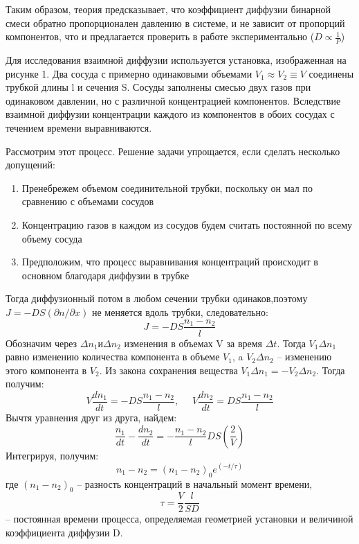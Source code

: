 \documentclass[a4paper,12pt]{article}
\begin{document}
Таким образом, теория предсказывает, что коэффициент диффузии бинарной смеси обратно пропорционален давлению в системе, и не зависит от пропорций компонентов, что и предлагается проверить в работе экспериментально ($D\propto\frac{1}{P}$)

Для исследования взаимной диффузии используется установка, изображенная на рисунке 1. Два сосуда с примерно одинаковыми объемами $V_1 \approx V_2 \equiv V$ соединены трубкой длины l и сечения S. Сосуды заполнены смесью двух газов при одинаковом давлении, но с различной концентрацией компонентов. Вследствие взаимной диффузии концентрации каждого из компонентов в обоих сосудах с течением времени выравниваются. 

Рассмотрим этот процесс. Решение задачи упрощается, если сделать несколько допущений:
\begin{enumerate}
\itemsep0em
\item Пренебрежем объемом соединительной трубки, поскольку он мал по сравнению с объемами сосудов
\item Концентрацию газов в каждом из сосудов будем считать постоянной по всему объему сосуда
\item Предположим, что процесс выравнивания концентраций происходит в основном благодаря диффузии в трубке
\end{enumerate}
Тогда диффузионный потом в любом сечении трубки одинаков,поэтому $J = -DS(\partial n/ \partial x)$ не меняется вдоль трубки, следовательно:
\begin{equation}
J = -DS\frac{n_1 - n_2}{l}
\end{equation}
Обозначим через $\Delta n_1 \text{и} \Delta n_2$ изменения в объемах V за время $\Delta t$. Тогда $V_1\Delta n_1$ равно изменению количества компонента в объеме $V_1$, a $V_2\Delta n_2$ -- изменению этого компонента в $V_2$. Из закона сохранения вещества $V_1\Delta n_1 = -V_2\Delta n_2$. Тогда получим:
\begin{equation}
V\frac{dn_1}{dt} = -DS\frac{n_1 - n_2}{l}, \;\;\;\;\ V\frac{dn_2}{dt} = DS\frac{n_1 - n_2}{l}
\end{equation}
Вычтя уравнения друг из друга, найдем:
\begin{equation}
\frac{n_1}{dt} - \frac{dn_2}{dt} = -\frac{n_1 - n_2}{l}DS(\frac{2}{V})
\end{equation}
Интегрируя, получим:
\begin{equation}
n_1 - n_2 = (n_1 - n_2)_0 e^{(-t/\tau)}
\end{equation}
где $(n_1 - n_2)_0$ -- разность концентраций в начальный момент времени, 
\begin{equation}
\tau = \dfrac{V}{2}\dfrac{l}{SD}
\end{equation}
 -- постоянная времени процесса, определяемая геометрией установки и величиной коэффициента диффузии D.
\end{document}
